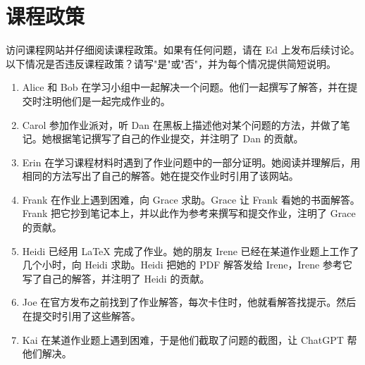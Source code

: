 \documentclass[11pt,a4paper]{article}
\begin{document}
\section{课程政策}

访问课程网站并仔细阅读课程政策。如果有任何问题，请在 Ed 上发布后续讨论。以下情况是否违反课程政策？请写"是"或"否"，并为每个情况提供简短说明。

\begin{enumerate}[label=(\alph*)]
    \item \begin{examplebox}
        Alice 和 Bob 在学习小组中一起解决一个问题。他们一起撰写了解答，并在提交时注明他们是一起完成作业的。
    \end{examplebox}
    
    \item \begin{examplebox}
        Carol 参加作业派对，听 Dan 在黑板上描述他对某个问题的方法，并做了笔记。她根据笔记撰写了自己的作业提交，并注明了 Dan 的贡献。
    \end{examplebox}
    
    \item \begin{examplebox}
        Erin 在学习课程材料时遇到了作业问题中的一部分证明。她阅读并理解后，用相同的方法写出了自己的解答。她在提交作业时引用了该网站。
    \end{examplebox}
    
    \item \begin{examplebox}
        Frank 在作业上遇到困难，向 Grace 求助。Grace 让 Frank 看她的书面解答。Frank 把它抄到笔记本上，并以此作为参考来撰写和提交作业，注明了 Grace 的贡献。
    \end{examplebox}
    
    \item \begin{examplebox}
        Heidi 已经用 \LaTeX{} 完成了作业。她的朋友 Irene 已经在某道作业题上工作了几个小时，向 Heidi 求助。Heidi 把她的 PDF 解答发给 Irene，Irene 参考它写了自己的解答，并注明了 Heidi 的贡献。
    \end{examplebox}
    
    \item \begin{examplebox}
        Joe 在官方发布之前找到了作业解答，每次卡住时，他就看解答找提示。然后在提交时引用了这些解答。
    \end{examplebox}
    
    \item \begin{examplebox}
        Kai 在某道作业题上遇到困难，于是他们截取了问题的截图，让 ChatGPT 帮他们解决。
    \end{examplebox}
\end{enumerate}
\end{document}
